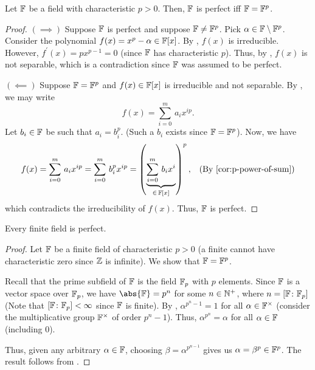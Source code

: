 \begin{prop} \label{prop:perfect-iff-F=F^p}
    Let $\mathbb{F}$ be a field with characteristic $p > 0$. Then, $\mathbb{F}$ is perfect iff $\mathbb{F} = \mathbb{F}^p$.
\end{prop}
\begin{proof}
    $(\implies)$ Suppose $\mathbb{F}$ is perfect and suppose $\mathbb{F} \neq \mathbb{F}^p$. Pick $\alpha \in \mathbb{F} \setminus \mathbb{F}^p$. Consider the polynomial $f(x) = x^p - \alpha \in \mathbb{F}[x]$. By , $f(x)$ is irreducible. However, $f^{\prime}(x) = px^{p-1} = 0$ (since $\mathbb{F}$ has characteristic $p$). Thus, by , $f(x)$ is not separable, which is a contradiction since $\mathbb{F}$ was assumed to be perfect.
    
    $(\impliedby)$ Suppose $\mathbb{F} = \mathbb{F}^p$ and $f(x) \in \mathbb{F}[x]$ is irreducible and not separable. By , we may write 
    \[
        f(x) = \sum_{i=0}^m \, a_i x^{ip}.
    \]
    Let $b_i \in \mathbb{F}$ be such that $a_i = b_i^p$. (Such a $b_i$ exists since $\mathbb{F} = \mathbb{F}^p$). Now, we have
    \begin{align*}
        f(x) &= \sum_{i=0}^m \, a_i x^{ip} = \sum_{i=0}^m \, b_i^p x^{ip} = \left( \underbrace{\sum_{i=0}^m \, b_i x^i}_{\in \, \F[x]} \right)^p, &\text{(By \Cref{cor:p-power-of-sum})}
    \end{align*}
    which contradicts the irreducibility of $f(x)$. Thus, $\mathbb{F}$ is perfect. 
\end{proof}

\begin{cor}
    Every finite field is perfect.
\end{cor}
\begin{proof}
    Let $\mathbb{F}$ be a finite field of characteristic $p > 0$ (a finite cannot have characteristic zero since $\mathbb{Z}$ is infinite). We show that $\mathbb{F} = \mathbb{F}^p$. 
    
    Recall that the prime subfield of $\mathbb{F}$ is the field $\mathbb{F}_p$ with $p$ elements. Since $\mathbb{F}$ is a vector space over $\mathbb{F}_p$, we have $\abs{\F} = p^n$ for some $n \in \mathbb{N}^+$, where $n = \left[ \mathbb{F} \colon \mathbb{F}_p \right]$ (Note that $\left[ \mathbb{F} \colon \mathbb{F}_p \right] < \infty$ since $\mathbb{F}$ is finite). By , $\alpha^{p^n -1} = 1$ for all $\alpha \in \mathbb{F}^{\times}$ (consider the multiplicative group $\mathbb{F}^{\times}$ of order $p^n - 1$). Thus, $\alpha^{p^n} = \alpha$ for all $\alpha \in \mathbb{F}$ (including $0$). 
    
    Thus, given any arbitrary $\alpha \in \mathbb{F}$, choosing $\beta = \alpha^{p^{n-1}}$ gives us $\alpha = \beta^p \in \mathbb{F}^p$. The result follows from .
\end{proof}

